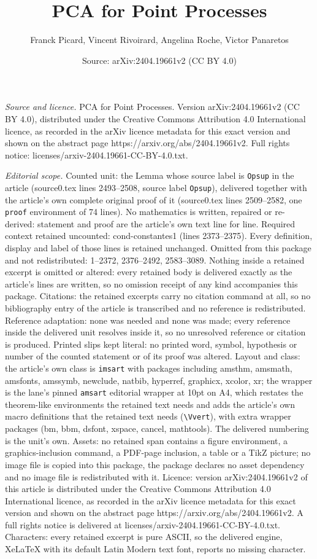 \documentclass[10pt,a4paper]{amsart}
\title[PCA for Point Processes]{PCA for Point Processes}
\author{Franck Picard, Vincent Rivoirard, Angelina Roche, Victor Panaretos}
\date{Source: arXiv:2404.19661v2 (CC BY 4.0)}
\begin{document}
\maketitle

\noindent\emph{Source and licence.} PCA for Point Processes. Version arXiv:2404.19661v2 (CC BY 4.0), distributed under the Creative Commons Attribution 4.0 International licence, as recorded in the arXiv licence metadata for this exact version and shown on the abstract page https://arxiv.org/abs/2404.19661v2. Full rights notice: licenses/arxiv-2404.19661-CC-BY-4.0.txt.\par\smallskip

\noindent\textit{Editorial scope.} Counted unit: the Lemma whose source label is \texttt{Opsup} in the article (source0.tex lines 2493--2508, source label \texttt{Opsup}), delivered together with the article's own complete original proof of it (source0.tex lines 2509--2582, one \texttt{proof} environment of 74 lines). No mathematics is written, repaired or re-derived: statement and proof are the article's own text line for line. Required context retained uncounted: cond-constantes1 (lines 2373--2375). Every definition, display and label of those lines is retained unchanged. Omitted from this package and not redistributed: 1--2372, 2376--2492, 2583--3089. Nothing inside a retained excerpt is omitted or altered: every retained body is delivered exactly as the article's lines are written, so no omission receipt of any kind accompanies this package. Citations: the retained excerpts carry no citation command at all, so no bibliography entry of the article is transcribed and no reference is redistributed. Reference adaptation: none was needed and none was made; every reference inside the delivered unit resolves inside it, so no unresolved reference or citation is produced. Printed slips kept literal: no printed word, symbol, hypothesis or number of the counted statement or of its proof was altered. Layout and class: the article's own class is \texttt{imsart} with packages including amsthm, amsmath, amsfonts, amssymb, newclude, natbib, hyperref, graphicx, xcolor, xr; the wrapper is the lane's pinned \texttt{amsart} editorial wrapper at 10pt on A4, which restates the theorem-like environments the retained text needs and adds the article's own macro definitions that the retained text needs (\texttt{\textbackslash Vvert}), with extra wrapper packages (bm, bbm, dsfont, xspace, cancel, mathtools). The delivered numbering is the unit's own. Assets: no retained span contains a figure environment, a graphics-inclusion command, a PDF-page inclusion, a table or a TikZ picture; no image file is copied into this package, the package declares no asset dependency and no image file is redistributed with it. Licence: version arXiv:2404.19661v2 of this article is distributed under the Creative Commons Attribution 4.0 International licence, as recorded in the arXiv licence metadata for this exact version and shown on the abstract page https://arxiv.org/abs/2404.19661v2. A full rights notice is delivered at licenses/arxiv-2404.19661-CC-BY-4.0.txt. Characters: every retained excerpt is pure ASCII, so the delivered engine, XeLaTeX with its default Latin Modern text font, reports no missing character.
\end{document}
